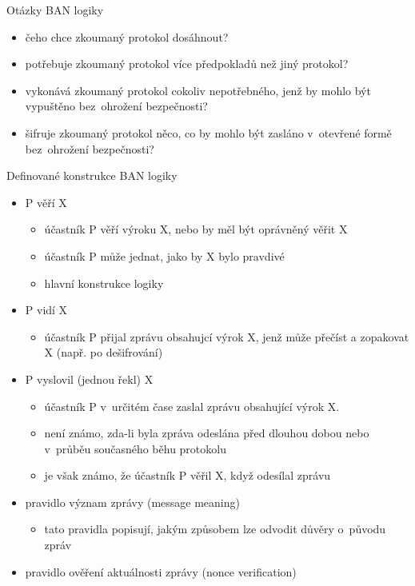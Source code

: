 Otázky BAN logiky
\begin{itemize}
    \item čeho chce zkoumaný protokol dosáhnout?
    \item potřebuje zkoumaný protokol více předpokladů než jiný protokol?
    \item vykonává zkoumaný protokol cokoliv nepotřebného, jenž by mohlo být vypuštěno bez~ohrožení bezpečnosti?
    \item šifruje zkoumaný protokol něco, co by mohlo být zasláno v~otevřené formě bez~ohrožení bezpečnosti? \\
\end{itemize}

Definované konstrukce BAN logiky
\begin{itemize}
    \item P věří X
    \begin{itemize}
        \item účastník P věří výroku X, nebo by měl být oprávněný věřit X
        \item účastník P může jednat, jako by X bylo pravdivé
        \item hlavní konstrukce logiky
    \end{itemize}
    \item P vidí X
    \begin{itemize}
        \item účastník P přijal zprávu obsahujcí výrok X, jenž může přečíst a zopakovat X (např. po dešifrování)
    \end{itemize}
    \item P vyslovil (jednou řekl) X
    \begin{itemize}
        \item účastník P v~určitém čase zaslal zprávu obsahující výrok X. 
        \item není známo, zda-li byla zpráva odeslána před dlouhou dobou nebo v~průběu současného běhu protokolu
        \item je však známo, že účastník P věřil X, když odesílal zprávu \\
    \end{itemize}
    \item pravidlo význam zprávy (message meaning)
    \begin{itemize}
        \item tato pravidla popisují, jakým způsobem lze odvodit důvěry o~původu zpráv
    \end{itemize}
    \item pravidlo ověření aktuálnosti zprávy (nonce verification)

\end{itemize}
